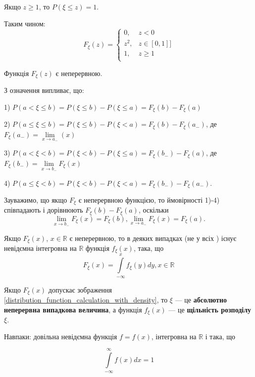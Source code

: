 Якщо $z \geqslant 1$, то $P(\xi \leqslant z) = 1$.

Таким чином: 
$$F_{\xi}(z) = \left\{ \begin{array}{ll}
    0, & z < 0 \\
    z^2, & z \in [0, 1]] \\
    1, & z \geqslant 1 \\
\end{array} \right.$$

\beautifulImage

Функція $F_{\xi}(z)$ є неперервною.


З означення випливає, що:

1) $P(a < \xi \leqslant b)
= P(\xi \leqslant b) - P(\xi \leqslant a)
= F_{\xi}(b) - F_{\xi}(a)$

\beautifulImage

2) $P(a \leqslant \xi \leqslant b)
= P(\xi \leqslant b) - P(\xi < a)
= F_{\xi}(b) - F_{\xi}(a_{-})$, де
$F_{\xi}(a_{-}) = \lim\limits_{x \rightarrow a_{-}}(x)$

3) $P(a < \xi < b)
= P(\xi < b) - P(\xi \leqslant a)
= F_{\xi}(b_{-}) - F_{\xi}(a)$, де
$F_{\xi}(b_{-}) = \lim\limits_{x \rightarrow b_{-}} F_{\xi}(x)$

4) $P(a \leqslant \xi < b)
= P(\xi < b) - P(\xi < a)
= F_{\xi}(b_{-}) - F_{\xi}(a_{-})$.


Зауважимо, що якщо $F_{\xi}$ є неперервною функцією, то ймовірності 1)-4)
співпадають і дорівнюють $F_{\xi}(b) - F_{\xi}(a)$, оскільки 
$$\lim\limits_{x \rightarrow b_{-}} F_{\xi}(x) = F_{\xi}(b),
\lim\limits_{x \rightarrow a_{-}} F_{\xi}(x) = F_{\xi}(a).$$

Якщо $F_{\xi}(x)$, $x \in \mathbb{R}$ є неперервною, то в деяких випадках (не у всіх )
існує невідємна інтегровна на $\mathbb{R}$ функція $f_{\xi}(x)$, така, що 
\begin{equation}
    \label{distribution_function_calculation_with_density}
    F_{\xi}(x) = \int\limits_{-\infty}^{x} f_{\xi}(y) dy, x \in \mathbb{R}
\end{equation}


Якщо $F_{\xi}(x)$ допускає зображення \ref{distribution_function_calculation_with_density},
то $\xi$ --- це \textbf{абсолютно неперервна випадкова величина}, а 
функція $f_{\xi}(x)$ --- це \textbf{щільність розподілу $\xi$}.

Навпаки: довільна невідємна функція $f = f(x)$, 
інтегровна на $\mathbb{R}$ і така, що 

\begin{equation}
    \label{density_function_requirements}
    \int\limits_{-\infty}^{\infty} f(x) dx = 1
\end{equation}

